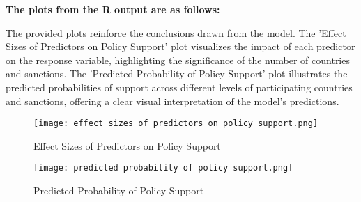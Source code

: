 \documentclass[12pt,letterpaper]{article}
\begin{document}
\textbf{The plots from the R output are as follows:}

The provided plots reinforce the conclusions drawn from the model. The 'Effect Sizes of Predictors on Policy Support' plot visualizes the impact of each predictor on the response variable, highlighting the significance of the number of countries and sanctions. The 'Predicted Probability of Policy Support' plot illustrates the predicted probabilities of support across different levels of participating countries and sanctions, offering a clear visual interpretation of the model's predictions.

\begin{figure}[H]
\centering
\texttt{[image: effect sizes of predictors on policy support.png]}
\caption{Effect Sizes of Predictors on Policy Support}
\label{fig:effect-sizes}
\end{figure}


\begin{figure}[H]
\centering
\texttt{[image: predicted probability of policy support.png]}
\caption{Predicted Probability of Policy Support}
\label{fig:predicted-probability}
\end{figure}


	
\end{document}
